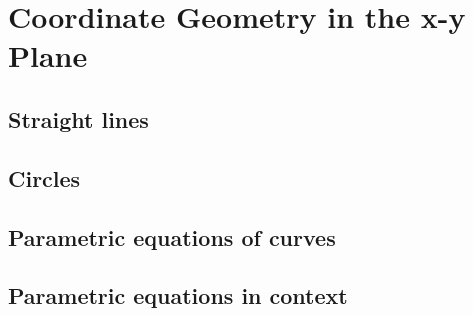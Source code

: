 \chapter{Coordinate Geometry in the x-y Plane}

\section{Straight lines}
\section{Circles}
\section{Parametric equations of curves}
\section{Parametric equations in context}

